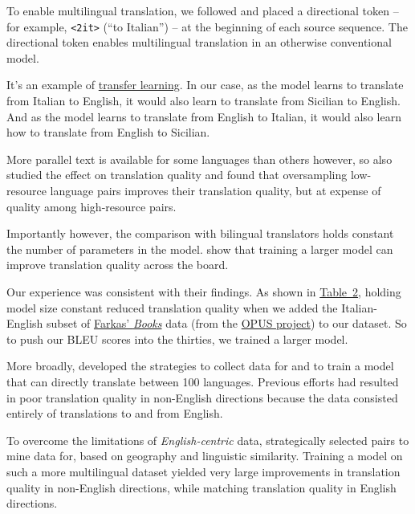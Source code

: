 \documentclass[10pt,letterpaper]{article}
\begin{document}
To enable multilingual translation, we followed \citet{johnson2017zeroshot} and placed a directional
token -- for example, \texttt{<2it>} (``to Italian'') -- at the beginning of each source sequence.
The directional token enables multilingual translation in an otherwise conventional model.

It's an example of \href{https://en.wikipedia.org/wiki/Transfer_learning}{transfer learning}. 
In our case, as the model learns to translate from Italian to English, it would also learn to translate 
from Sicilian to English.  And as the model learns to translate from English to Italian, 
it would also learn how to translate from English to Sicilian.
      
More parallel text is available for some languages than others however, so 
\citeauthor{johnson2017zeroshot} also studied the effect on translation quality
and found that oversampling low-resource language pairs improves
their translation quality, but at expense of quality among high-resource pairs.
      
Importantly however, the comparison with bilingual translators holds constant the number of parameters in the model.
\citet{arivazhagan2019massively} show that training a larger model can improve translation quality across the board.

Our experience was consistent with their findings.
As shown in \hyperlink{bleuscores}{Table~2}, %
holding model size constant reduced translation quality when we added 
the Italian-English subset of
\href{https://farkastranslations.com/bilingual_books.php}{Farkas' \textit{Books}} data
(from the \href{https://opus.nlpl.eu/}{OPUS project}) to our dataset.
So to push our BLEU scores into the thirties, we trained a larger model.

More broadly, \citet{fan2020beyond} developed the strategies to collect data for and
to train a model that can directly translate between 100 languages.
Previous efforts had resulted in poor translation quality in
non-English directions because the data consisted entirely of translations to and from English.

To overcome the limitations of \textit{English-centric} data, \citeauthor{fan2020beyond}
strategically selected pairs to mine data for, based on geography and linguistic similarity.
Training a model on such a more multilingual dataset yielded very large improvements in translation
quality in non-English directions, while matching translation quality in English directions.
      
\end{document}
